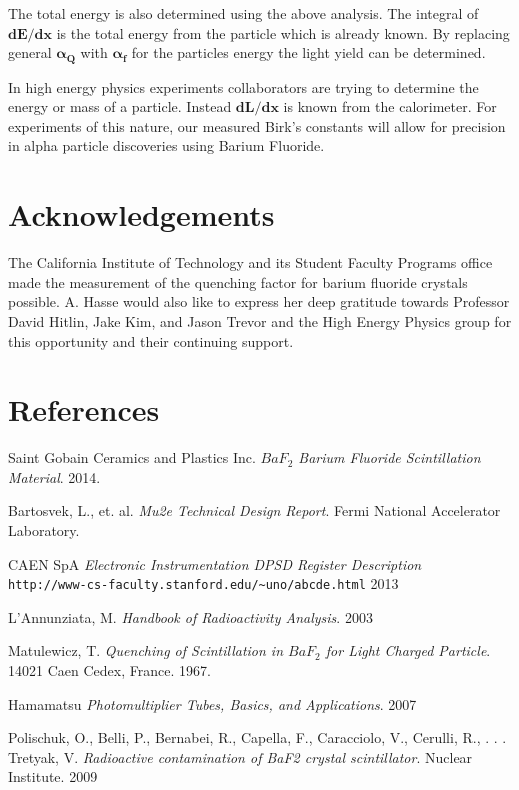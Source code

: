 \documentclass[aip, jmp, amsmath, amssymb, reprint, floatfix]{revtex4-1}
\newcommand{\squeezeup}{\vspace{-4.5mm}}
\begin{document}
The total energy is also determined using the above analysis. The integral of $\bm{dE/dx}$ is the total energy from the particle which is already known. By replacing general $\bm{\alpha_Q}$ with $\bm{\alpha_f}$ for the particles energy the light yield can be determined. 

In high energy physics experiments collaborators are trying to determine the energy or mass of a particle. Instead $\bm{dL/dx}$ is known from the calorimeter. For experiments of this nature, our measured Birk's constants will allow for precision in alpha particle discoveries using Barium Fluoride. 

\section{\label{sec:level1}Acknowledgements}
\squeezeup

The California Institute of Technology and its Student Faculty Programs office made the measurement of the quenching factor for barium fluoride crystals possible. A. Hasse would also like to express her deep gratitude towards Professor David Hitlin, Jake Kim, and Jason Trevor and the High Energy Physics group for this opportunity and their continuing support. 
\squeezeup

\section{\label{sec:level1}References}
\squeezeup

\begin{thebibliography}{9}
Saint Gobain Ceramics and Plastics Inc. 
\textit{$BaF_2$ Barium Fluoride Scintillation Material}. 
2014.
 
Bartosvek, L., et. al.
\textit{Mu2e Technical Design Report}.
Fermi National Accelerator Laboratory. 
 
CAEN SpA
\textit{Electronic Instrumentation DPSD Register Description}
\\\texttt{http://www-cs-faculty.stanford.edu/\~{}uno/abcde.html}
2013

L'Annunziata, M.
\textit{Handbook of Radioactivity Analysis}.
2003

Matulewicz, T.
\textit{Quenching of Scintillation in $BaF_2$ for Light Charged Particle}.
14021 Caen Cedex, France. 1967.

Hamamatsu
\textit{Photomultiplier Tubes, Basics, and Applications}.
2007

Polischuk, O., Belli, P., Bernabei, R., Capella, F., Caracciolo, V., Cerulli, R., . . . Tretyak, V.
\textit{Radioactive contamination of BaF2 crystal scintillator}.
Nuclear Institute. 2009

\end{thebibliography}
\end{document}
